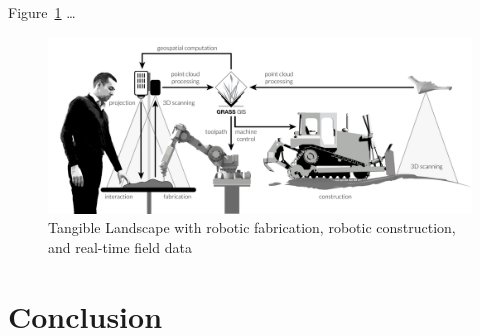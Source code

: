 \documentclass[prodmode,acmtochi]{acmsmall} %
\begin{document}

Figure~\ref{fig:system_schema_land} \ldots 

\begin{figure}%
\begin{center}
\includegraphics[width=\textwidth]{images/system_schema_land.pdf}
\caption{Tangible Landscape with robotic fabrication, robotic construction, and real-time field data}
\label{fig:system_schema_land}
\end{center}
\end{figure}

\section{Conclusion}

\end{document}
